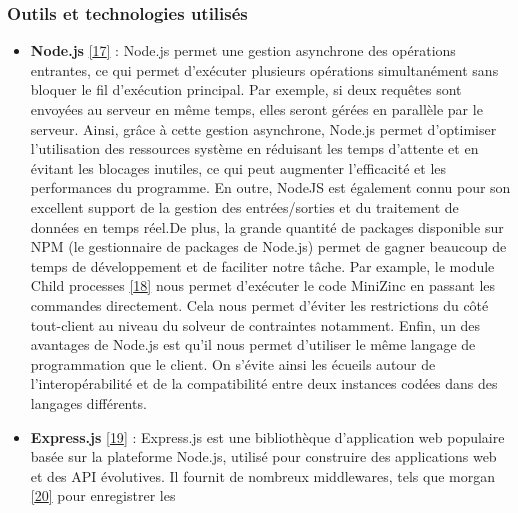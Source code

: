 \documentclass[12pt]{article}
\begin{document}
\iffalse                            
\hypertarget{outils-et-technologies-utilisuxe9s-1}{%
  \subsubsection{Outils et technologies
    utilisés}\label{outils-et-technologies-utilisuxe9s-1}}

\begin{itemize}
  \item
        \textbf{Node.js} \protect\hyperlink{ref-Node_js}{{[}17{]}} : Node.js
        permet une gestion asynchrone des opérations entrantes, ce qui permet
        d'exécuter plusieurs opérations simultanément sans bloquer le fil
        d'exécution principal. Par exemple, si deux requêtes sont envoyées au
        serveur en même temps, elles seront gérées en parallèle par le
        serveur. Ainsi, grâce à cette gestion asynchrone, Node.js permet
        d'optimiser l'utilisation des ressources système en réduisant les
        temps d'attente et en évitant les blocages inutiles, ce qui peut
        augmenter l'efficacité et les performances du programme. En outre,
        NodeJS est également connu pour son excellent support de la gestion
        des entrées/sorties et du traitement de données en temps
        réel.\newline  De plus, la grande quantité de packages disponible sur
        NPM (le gestionnaire de packages de Node.js) permet de gagner beaucoup
        de temps de développement et de faciliter notre tâche. Par example, le
        module Child processes
        \protect\hyperlink{ref-Child_Processes}{{[}18{]}} nous permet
        d'exécuter le code MiniZinc en passant les commandes directement. Cela
        nous permet d'éviter les restrictions du côté tout-client au niveau du
        solveur de contraintes notamment. Enfin, un des avantages de Node.js
        est qu'il nous permet d'utiliser le même langage de programmation que
        le client. On s'évite ainsi les écueils autour de l'interopérabilité
        et de la compatibilité entre deux instances codées dans des langages
        différents.
  \item
        \textbf{Express.js} \protect\hyperlink{ref-Express_js}{{[}19{]}} :
        Express.js est une bibliothèque d'application web populaire basée sur
        la plateforme Node.js, utilisé pour construire des applications web et
        des API évolutives. Il fournit de nombreux middlewares, tels que
        morgan \protect\hyperlink{ref-morgan}{{[}20{]}} pour enregistrer les

\end{itemize}
\end{document}
